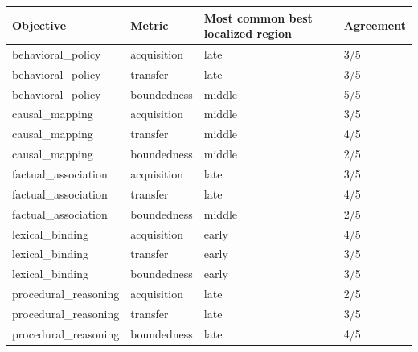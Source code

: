 \begin{tabular}{llll}
\toprule
Objective & Metric & Most common best localized region & Agreement \\
\midrule
behavioral\_policy & acquisition & late & 3/5 \\
behavioral\_policy & transfer & late & 3/5 \\
behavioral\_policy & boundedness & middle & 5/5 \\
causal\_mapping & acquisition & middle & 3/5 \\
causal\_mapping & transfer & middle & 4/5 \\
causal\_mapping & boundedness & middle & 2/5 \\
factual\_association & acquisition & late & 3/5 \\
factual\_association & transfer & late & 4/5 \\
factual\_association & boundedness & middle & 2/5 \\
lexical\_binding & acquisition & early & 4/5 \\
lexical\_binding & transfer & early & 3/5 \\
lexical\_binding & boundedness & early & 3/5 \\
procedural\_reasoning & acquisition & late & 2/5 \\
procedural\_reasoning & transfer & late & 3/5 \\
procedural\_reasoning & boundedness & late & 4/5 \\
\bottomrule
\end{tabular}
